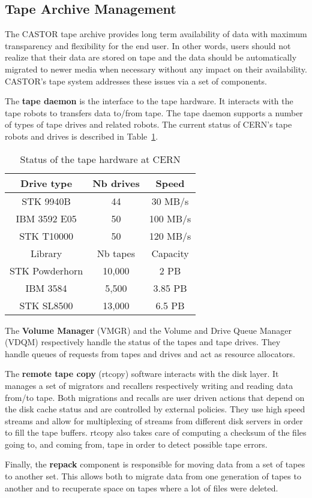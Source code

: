 
\subsection{Tape Archive Management}

The CASTOR tape archive provides long term availability
of data with maximum transparency and flexibility for the end user.
In other words, users should not realize that their data are
stored on tape and the data should be automatically migrated to
newer media when necessary without any impact on their availability.
CASTOR's tape system addresses these issues via a set
of components.

The {\bf tape daemon} is the interface to the tape hardware. It interacts
with the tape robots to transfers data to/from tape.
The tape daemon supports a number of types of tape drives and related robots.
The current status of CERN's tape robots and drives is described in
Table~\ref{tapehardware}.

\begin{table}[htbp]
  \begin{center}
  \begin{tabular}{|c|c|c|}
    \hline
      Drive type     & Nb drives & Speed \\
    \hline
      STK 9940B      & 44        & 30 MB/s \\
      IBM 3592 E05   & 50        & 100 MB/s \\
      STK T10000     & 50        & 120 MB/s \\
    \hline
    \hline
      Library        & Nb tapes & Capacity \\
    \hline
      STK Powderhorn & 10,000   & 2 PB \\
      IBM 3584       &  5,500   & 3.85 PB \\
      STK SL8500     & 13,000   & 6.5 PB \\
    \hline
  \end{tabular}
  \end{center}
  \caption{Status of the tape hardware at CERN}
  \label{tapehardware}
\end{table}

The {\bf Volume Manager} (VMGR) and the Volume and Drive Queue Manager (VDQM)
respectively handle the status of the tapes and tape drives. They handle
queues of requests from tapes and drives and act as resource allocators.

The {\bf remote tape copy} (rtcopy) software interacts with the disk layer.
It manages a set of migrators and recallers respectively writing and reading
data from/to tape. Both migrations and recalls are user driven actions
that depend on the disk cache status and are controlled by external policies.
They use high speed streams and allow for multiplexing of streams from
different disk servers in order to fill the tape buffers.
rtcopy also takes care of computing a checksum of the files going to, and
coming from, tape in order to detect possible tape errors.

Finally, the {\bf repack} component is responsible for moving data from a set of
tapes to another set. This allows both to migrate data from one generation
of tapes to another and to recuperate space on tapes where a lot of files
were deleted.
